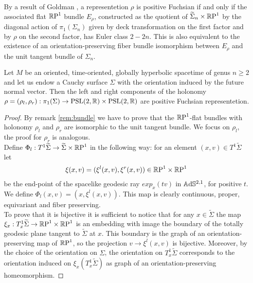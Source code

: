 \begin{observation}\label{rem:bundle}
    By a result of Goldman \cite{goldman1980discontinuous}, a representetion $\rho$ is positive Fuchsian if and only if the associated flat $\S$ bundle $E_\rho$, constructed as the quotient of $\widetilde{\Sigma}_n \times \S$ by the diagonal action of $\pi_1(\Sigma_n)$ given by deck transformation on the first factor and by $\rho$ on the second factor, has Euler class $2-2n$. This is also equivalent to the existence of an orientation-preserving fiber bundle isomorphism between $E_\rho$ and the unit tangent bundle of $\Sigma_n$.
\end{observation}
\begin{proposition}
    Let $M$ be an oriented, time-oriented, globally hyperbolic spacetime of genus $n\geq 2$ and let us endow a Cauchy surface $\Sigma$ with the orientation induced by the future normal vector. Then the left and right components of the holonomy $\rho=(\rho_l,\rho_r): \pi_1(\Sigma)\to\PSL\times\PSL$ are positive Fuchsian representetion.
\end{proposition}
\begin{proof}
    By remark \ref{rem:bundle} we have to prove that the $\S$-flat bundles with holonomy $\rho_l$ and $\rho_r$ are isomorphic to the unit tangent bundle. We focus on $\rho_l$, the proof for $\rho_r$ is analogous.\\
    Define $\Phi_l : T^1 \widetilde{\Sigma} \to \widetilde{\Sigma} \times \S$ in the following way: for an element $(x,v) \in T^1 \widetilde{\Sigma}$ let
    \[
        \xi(x,v) = (\xi^l(x,v), \xi^r(x,v)) \in \T
    \]
    be the end-point of the spacelike geodesic ray $exp_x(tv)$ in $\A^{2,1}$, for positive $t$. We define $\Phi_l(x,v)=(x, \xi^l(x,v))$. This map is clearly continuous, proper,
    equivariant and fiber preserving.\\
    To prove that it is bijective it is sufficient to notice that for any $x \in \widetilde{\Sigma}$ the map $\xi_x : T^1_x \widetilde{\Sigma} \to \T$ is an embedding with image the boundary of the totally geodesic plane tangent to $\widetilde{\Sigma}$ at $x$. This boundary is the graph of an orientation-preserving map of $\S$, so the projection $v \to \xi^l(x,v)$ is bijective. Moreover, by the choice of the orientation on $\Sigma$, the orientation on $T^1_x \widetilde{\Sigma}$ corresponds to the orientation induced on $\xi_x (T^1_x \widetilde{\Sigma})$ as graph of an orientation-preserving homeomorphism.
\end{proof}

